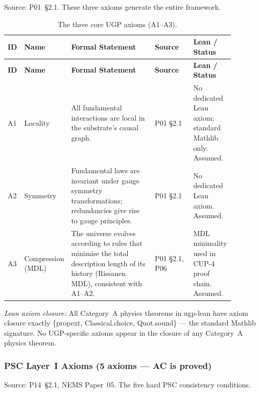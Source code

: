 Source: P01~\S2.1. These three axioms generate the entire framework.

\begingroup\footnotesize\renewcommand{\arraystretch}{1.2}
\begin{longtable}{@{}P{0.05\linewidth}P{0.13\linewidth}P{0.37\linewidth}P{0.17\linewidth}P{0.16\linewidth}@{}}
\caption{The three core UGP axioms (A1--A3).}
\label{tab:mi-core-axioms}\\
\toprule
\textbf{ID} & \textbf{Name} & \textbf{Formal Statement} &
  \textbf{Source} & \textbf{Lean / Status} \\
\midrule
\endfirsthead
\midrule
\textbf{ID} & \textbf{Name} & \textbf{Formal Statement} &
  \textbf{Source} & \textbf{Lean / Status} \\
\midrule
\endhead
\bottomrule
\endfoot
A1 & Locality & All fundamental interactions are local in the substrate's causal graph. &
  P01 \S2.1 & No dedicated Lean axiom; standard Mathlib only. Assumed. \\
A2 & Symmetry & Fundamental laws are invariant under gauge symmetry transformations;
  redundancies give rise to gauge principles. &
  P01 \S2.1 & No dedicated Lean axiom. Assumed. \\
A3 & Compression (MDL) & The universe evolves according to rules that minimise the total
  description length of its history (Rissanen MDL), consistent with A1--A2. &
  P01 \S2.1, P06 &
  MDL minimality used in CUP-4 proof chain. Assumed. \\
\end{longtable}
\endgroup

\noindent\textit{Lean axiom closure:} All Category~A physics theorems in ugp-lean have
axiom closure exactly \{propext, Classical.choice, Quot.sound\} — the standard Mathlib
signature. No UGP-specific axioms appear in the closure of any Category~A physics theorem.

\subsubsection{PSC Layer~I Axioms (5 axioms — AC is proved)}
\label{sec:mi-psc-layer1}

Source: P14~\S2.1, NEMS Paper~05. The five hard PSC consistency conditions.

